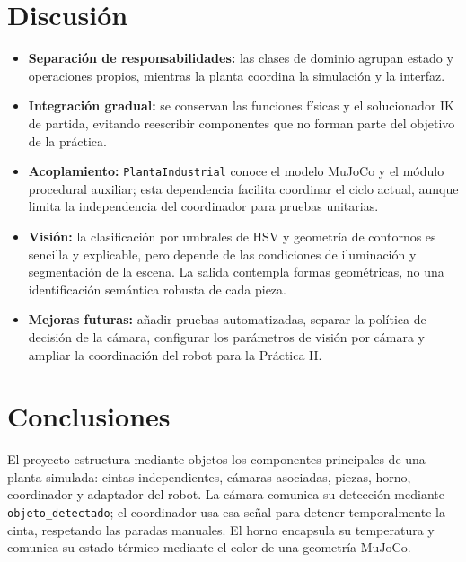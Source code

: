 \documentclass[12pt,a4paper]{article}
\begin{document}

\section{Discusión}

\begin{itemize}
    \item \textbf{Separación de responsabilidades:} las clases de dominio agrupan estado y operaciones propios, mientras la planta coordina la simulación y la interfaz.
    \item \textbf{Integración gradual:} se conservan las funciones físicas y el solucionador IK de partida, evitando reescribir componentes que no forman parte del objetivo de la práctica.
    \item \textbf{Acoplamiento:} \texttt{PlantaIndustrial} conoce el modelo MuJoCo y el módulo procedural auxiliar; esta dependencia facilita coordinar el ciclo actual, aunque limita la independencia del coordinador para pruebas unitarias.
    \item \textbf{Visión:} la clasificación por umbrales de HSV y geometría de contornos es sencilla y explicable, pero depende de las condiciones de iluminación y segmentación de la escena. La salida contempla formas geométricas, no una identificación semántica robusta de cada pieza.
    \item \textbf{Mejoras futuras:} añadir pruebas automatizadas, separar la política de decisión de la cámara, configurar los parámetros de visión por cámara y ampliar la coordinación del robot para la Práctica II.
\end{itemize}


\section{Conclusiones}

El proyecto estructura mediante objetos los componentes principales de una
planta simulada: cintas independientes, cámaras asociadas, piezas, horno,
coordinador y adaptador del robot. La cámara comunica su detección mediante
\texttt{objeto\_detectado}; el coordinador usa esa señal para detener
temporalmente la cinta, respetando las paradas manuales. El horno encapsula su
temperatura y comunica su estado térmico mediante el color de una geometría
MuJoCo.
\end{document}
